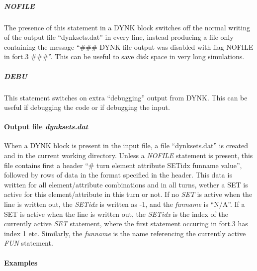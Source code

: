 \subparagraph{NOFILE}
The presence of this statement in a DYNK block switches off the normal writing of the output file ``dynksets.dat'' in every line, instead producing a file only containing the message ``\#\#\# DYNK file output was disabled with flag NOFILE in fort.3 \#\#\#''.
This can be useful to save disk space in very long simulations.

\subparagraph{DEBU}
This statement switches on extra ``debugging'' output from DYNK.
This can be useful if debugging the code or if debugging the input.

\paragraph{Output file \emph{dynksets.dat}}
When a DYNK block is present in the input file, a file ``dynksets.dat'' is created and in the current working directory.
Unless a \emph{NOFILE} statement is present, this file contains first a header ``\# turn element attribute SETidx funname value'', followed by rows of data in the format specified in the header.
This data is written for all element/attribute combinations and in all turns, wether a SET is active for this element/attribute in this turn or not.
If no \emph{SET} is active when the line is written out, the \emph{SETidx} is written as -1, and the \emph{funname} is ``N/A''.
If a SET is active when the line is written out, the \emph{SETidx} is the index of the currently active \emph{SET} statement, where the first statement occuring in fort.3 has index 1 etc.
Similarly, the \emph{funname} is the name referencing the currently active \emph{FUN} statement.

\paragraph{Examples}

